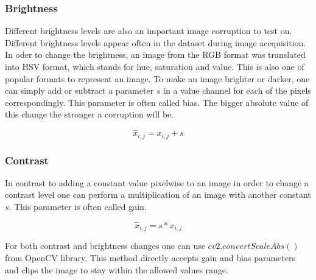 \subsubsection{Brightness}
Different brightness levels are also an important image corruption to test on. Different brightness levels appear often in the dataset during image accquisition. In oder to change the brightness, an image from the RGB format was translated into HSV format, which stands for hue, saturation and value. This is also one of popular formats to represent an image. To make an image brighter or darker, one can simply add or subtract a parameter $s$ in a value channel for each of the pixels correspondingly. This parameter is often called bias. The bigger absolute value of this change the stronger a corruption will be.

\begin{equation}
    \hat{x}_{i, j} = x_{i, j} + s
\end{equation}

\subsubsection{Contrast}
In contrast to adding a constant value pixelwise to an image in order to change a contrast level one can perform a multiplication of an image with another constant $s$. This parameter is often called gain.

\begin{equation}
    \hat{x}_{i, j} = s * x_{i, j}
\end{equation}

For both contrast and brightness changes one can use $cv2.convertScaleAbs()$ from OpenCV library. This method directly accepts gain and bias parameters and clips the image to stay within the allowed values range.


